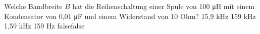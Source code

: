     {Welche Bandbreite $B$ hat die Reihenschaltung einer Spule von 100 μH mit einem Kondensator von 0,01 μF und einem Widerstand von 10 Ohm?}
    {15,9 kHz}
    {159 kHz}
    {1,59 kHz}
    {159 Hz}
    {false}{false}